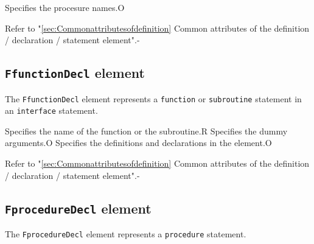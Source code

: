 \begin{XcodeMLChildElements}
{Specifies the procesure names.}{O}
\end{XcodeMLChildElements}

\begin{XcodeMLAttributes}
{Refer to "\ref{sec:Commonattributesofdefinition} Common attributes of the definition / declaration / statement element".}{-}
\end{XcodeMLAttributes}


\subsection{ {\tt FfunctionDecl} element}

The {\tt FfunctionDecl} element represents a {\tt function} or {\tt subroutine} statement in an {\tt interface} statement.


\begin{XcodeMLChildElements}
{Specifies the name of the function or the subroutine.}{R}
{Specifies the dummy arguments.}{O}
{Specifies the definitions and declarations in the element.}{O}
\end{XcodeMLChildElements}

\begin{XcodeMLAttributes}
{Refer to "\ref{sec:Commonattributesofdefinition} Common attributes of the definition / declaration / statement element".}{-}
\end{XcodeMLAttributes}


\subsection{ {\tt FprocedureDecl} element}

The {\tt FprocedureDecl} element represents a {\tt procedure} statement.


